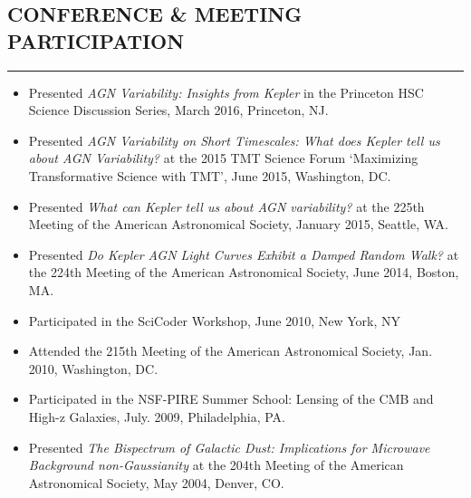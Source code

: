 \documentclass[10pt,a4]{article}
\newcounter{mySaveCounter}
\newcommand\myEnumReset{\setcounter{mySaveCounter}{0}}
\begin{document}
\myEnumReset 

\subsection*{CONFERENCE \& MEETING PARTICIPATION}
\hrule  height 4pt
\vspace{0.2cm}

\begin{itemize}

    \item Presented {\it AGN Variability: Insights from Kepler} in the Princeton HSC Science Discussion Series, March 2016, Princeton, NJ.

    \item Presented {\it AGN Variability on Short Timescales: What does Kepler tell us about AGN Variability?} at the 2015 TMT Science Forum `Maximizing Transformative Science with TMT', June 2015, Washington, DC.

    \item Presented {\it What can Kepler tell us about AGN variability?} at the 225th Meeting of the American Astronomical Society, January 2015, Seattle, WA.

    \item Presented {\it Do Kepler AGN Light Curves Exhibit a Damped Random Walk?} at the 224th Meeting of the American Astronomical Society, June 2014, Boston, MA.
    
    \item Participated in the SciCoder Workshop, June 2010, New York, NY
    
    \item Attended the 215th Meeting of the American Astronomical Society, Jan. 2010, Washington, DC.
    
    \item Participated in the NSF-PIRE Summer School: Lensing of the CMB and High-z Galaxies, July. 2009, Philadelphia, PA.
    
    \item  Presented {\it The Bispectrum of Galactic Dust: Implications for Microwave Background non-Gaussianity} at the 204th Meeting of the American Astronomical Society, May 2004, Denver, CO.

\end{itemize}

\myEnumReset 
\end{document}
